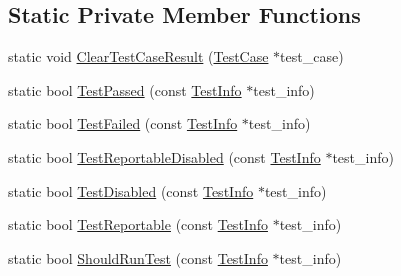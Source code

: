 \subsection*{Static Private Member Functions}
\begin{DoxyCompactItemize}
\item 
static void \mbox{\hyperlink{classtesting_1_1_test_case_a1c05fe33863b79b1b1ed19e665a1cea7}{Clear\+Test\+Case\+Result}} (\mbox{\hyperlink{classtesting_1_1_test_case}{Test\+Case}} $\ast$test\+\_\+case)
\item 
static bool \mbox{\hyperlink{classtesting_1_1_test_case_ad8d9e1ebc410000b679002ba71d78686}{Test\+Passed}} (const \mbox{\hyperlink{classtesting_1_1_test_info}{Test\+Info}} $\ast$test\+\_\+info)
\item 
static bool \mbox{\hyperlink{classtesting_1_1_test_case_a5922884cb8b4819e869146dc315a1ac1}{Test\+Failed}} (const \mbox{\hyperlink{classtesting_1_1_test_info}{Test\+Info}} $\ast$test\+\_\+info)
\item 
static bool \mbox{\hyperlink{classtesting_1_1_test_case_a1f2da5337f941d746dfcb98bc4acc149}{Test\+Reportable\+Disabled}} (const \mbox{\hyperlink{classtesting_1_1_test_info}{Test\+Info}} $\ast$test\+\_\+info)
\item 
static bool \mbox{\hyperlink{classtesting_1_1_test_case_a2c6989cdeac01b2153f2e34dca1dbde6}{Test\+Disabled}} (const \mbox{\hyperlink{classtesting_1_1_test_info}{Test\+Info}} $\ast$test\+\_\+info)
\item 
static bool \mbox{\hyperlink{classtesting_1_1_test_case_a2c3767df71e07939b32f19ef9c6ed271}{Test\+Reportable}} (const \mbox{\hyperlink{classtesting_1_1_test_info}{Test\+Info}} $\ast$test\+\_\+info)
\item 
static bool \mbox{\hyperlink{classtesting_1_1_test_case_a75eb139557c43362f94916cfd6762c94}{Should\+Run\+Test}} (const \mbox{\hyperlink{classtesting_1_1_test_info}{Test\+Info}} $\ast$test\+\_\+info)
\end{DoxyCompactItemize}
